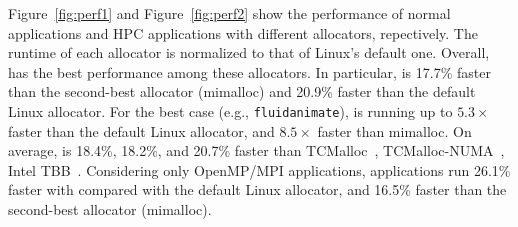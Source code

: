 Figure~\ref{fig:perf1} and Figure~\ref{fig:perf2} show the performance of normal applications and HPC applications with different allocators, repectively. The runtime of each allocator is normalized to that of Linux's default one. 
Overall, \NM{} has the best performance among these allocators. In particular, \NM{} is 17.7\% faster than the second-best allocator (mimalloc) and 20.9\% faster than the default Linux allocator. 
For the best case (e.g., \texttt{fluidanimate}), \NM{} is running up to $5.3\times$ faster than the default Linux allocator, and $8.5\times$ faster than mimalloc.
On average, \NM{} is 18.4\%, 18.2\%, and 20.7\% faster than TCMalloc~\cite{tcmalloc2}, TCMalloc-NUMA~\cite{tcmallocnuma}, Intel TBB~\cite{tbb3}. Considering only OpenMP/MPI applications, applications run 26.1\% faster with \NM{} compared with the default Linux allocator, and 16.5\% faster than the second-best allocator (mimalloc).

